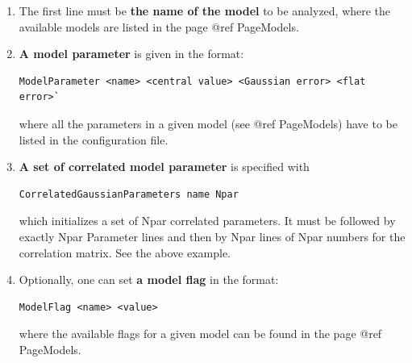\documentclass[preprint,3p,12pt]{elsarticle}
\begin{document}
\begin{enumerate}
\item The first line must be {\bf the name of the model} to be analyzed,
   where the available models are listed in the page @ref PageModels.
  
\item  {\bf A model parameter} is given in the format:
\begin{lstlisting}
ModelParameter <name> <central value> <Gaussian error> <flat error>`
\end{lstlisting}
where all the parameters in a given model (see @ref PageModels) have
  to be listed in the configuration file.

\item {\bf A set of correlated model parameter} is specified with 
\begin{lstlisting}
CorrelatedGaussianParameters name Npar
\end{lstlisting}
   which initializes a set of Npar correlated parameters. It must be
   followed by exactly Npar Parameter lines and then by Npar lines of
   Npar numbers for the correlation matrix. See the above example.

\item  Optionally, one can set {\bf a model flag} in the format:

\begin{lstlisting}
ModelFlag <name> <value>
\end{lstlisting}

  where the available flags for a given model can be found in the page
  @ref PageModels.


\end{enumerate}
\end{document}
